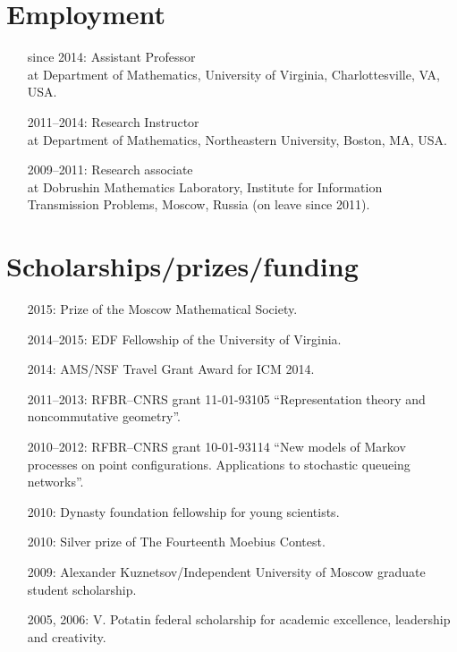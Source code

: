 \documentclass[letterpaper,11pt]{article}
\begin{document}
\section*{Employment}

\begin{itemize}
\item[since 2014:]
Assistant Professor\\
at Department of Mathematics, 
University of Virginia, 
Charlottesville, VA, USA.

\item[2011--2014:]
Research Instructor\\ at
Department of Mathematics,
Northeastern University, Boston, MA, USA.

\item[2009--2011:]
Research associate\\
at
Dobrushin Mathematics Laboratory,
Institute for Information Transmission Problems, Moscow, Russia (on leave since 2011).
\end{itemize}

\section*{Scholarships/prizes/funding}
\begin{itemize}
  \item[2015:] Prize of the Moscow Mathematical Society.

  \item[2014--2015:] EDF Fellowship of the University of Virginia. 

  \item[2014:] AMS/NSF Travel Grant Award for ICM 2014.

  \item[2011--2013:] RFBR--CNRS grant 11-01-93105 ``Representation theory and noncommutative geometry''.
  
  \item[2010--2012:] RFBR--CNRS grant 10-01-93114 ``New models of Markov processes on point configurations. Applications to stochastic queueing networks''.

  \item[2010:] Dynasty foundation fellowship for young scientists.
    
  \item[2010:] Silver prize of The Fourteenth Moebius Contest.

  \item[2009:] Alexander Kuznetsov/Independent University of Moscow graduate student scholarship.

  \item[2005, 2006:] V. Potatin federal scholarship for academic excellence, leadership and creativity.
\end{itemize}
\end{document}
